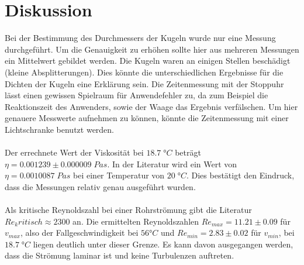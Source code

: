 \section{Diskussion}
\label{sec:Diskussion}
Bei der Bestimmung des Durchmessers der Kugeln wurde nur eine Messung durchgeführt. Um die Genauigkeit zu erhöhen sollte hier aus mehreren Messungen ein Mittelwert 
gebildet werden. Die Kugeln waren an einigen Stellen beschädigt (kleine Absplitterungen). Dies könnte die unterschiedlichen Ergebnisse für die Dichten der Kugeln eine Erklärung sein.
Die Zeitenmessung mit der Stoppuhr lässt einen gewissen Spielraum für Anwendefehler zu, da zum Beispiel die Reaktionszeit des Anwenders, sowie der Waage das Ergebnis verfälschen.
Um hier genauere Messwerte aufnehmen zu können, könnte die Zeitenmessung mit einer Lichtschranke benutzt werden.
\\
\\
Der errechnete Wert der Viskosität bei $18.7\;\unit{°C}$ beträgt $\eta = 0.001239\pm0.000009\;\unit{Pas}$. In der Literatur wird ein Wert von $\eta = 0.0010087\;\unit{Pas}$ bei einer
Temperatur von $20\;\unit{°C}$. Dies bestätigt den Eindruck, dass die Messungen relativ genau ausgeführt wurden. 
\\
\\
Als kritische Reynoldszahl bei einer Rohrströmung gibt die Literatur $Re_kritisch \approx 2300$ an. Die ermittelten Reynoldszahlen $Re_{max} = 11.21 \pm 0.09$ für $v_{max}$, also der Fallgeschwindigkeit
bei $56\unit{°C}$ und $Re_{min} = 2.83 \pm 0.02$ für $v_{min}$, bei $18.7\;\unit{°C}$ liegen deutlich unter dieser Grenze. Es kann davon ausgegangen werden, dass die Strömung laminar ist und keine 
Turbulenzen auftreten.








\newpage